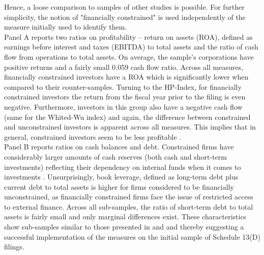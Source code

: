 \documentclass[12pt]{article}
\begin{document}
Hence, a loose comparison to samples of other studies is possible. For further simplicity, the notion of "financially constrained" is used independently of the measure initially used to identify them. \\
Panel A reports two ratios on profitability -- return on assets (ROA), defined as earnings before interest and taxes (EBITDA) to total assets and the ratio of cash flow from operations to total assets. On average, the sample's corporations have positive returns and a fairly small 0.059 cash flow ratio. Across all measures, financially constrained investors have a ROA which is significantly lower when compared to their counter-samples. Turning to the HP-Index, for financially constrained investors the return from the fiscal year prior to the filing is even negative. Furthermore, investors in this group also have a negative cash flow (same for the Whited-Wu index) and again, the difference between constrained and unconstrained investors is apparent across all measures. This implies that in general, constrained investors seem to be less profitable \citet[p.544]{Whited2006}. \\
Panel B reports ratios on cash balances and debt. Constrained firms have considerably larger amounts of cash reserves (both cash and short-term investments) reflecting their dependency on internal funds when it comes to investments \citep[p.142]{Fazzari1988}. Unsurprisingly, book leverage, defined as long-term debt plus current debt to total assets \citep[p.1440]{MacKay2005} is higher for firms considered to be financially unconstrained, as financially constrained firms face the issue of restricted access to external finance. Across all sub-samples, the ratio of short-term debt to total assets is fairly small and only marginal differences exist. These characteristics show sub-samples similar to those presented in \citet[p.544]{Whited2006} and \citet[p.1917]{hadlock2010} and thereby suggesting a successful implementation of the measures on the initial sample of Schedule 13(D) filings.
\end{document}
